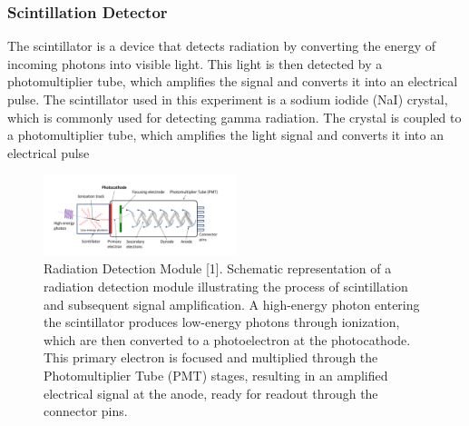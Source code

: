 \documentclass[12pt]{article}
\begin{document}
                \subsubsection{Scintillation Detector}
                        The scintillator is a device that detects radiation by converting the energy of incoming
                        photons into visible light. This light is then detected by a photomultiplier tube, which
                        amplifies the signal and converts it into an electrical pulse. The scintillator used in
                        this experiment is a sodium iodide (NaI) crystal, which is commonly used for detecting
                        gamma radiation. The crystal is coupled to a photomultiplier tube, which amplifies the
                        light signal and converts it into an electrical pulse
                

                \begin{figure}[!htb]
                        \centering
                        \includegraphics[width=0.5\textwidth]{./img/other/module.png}
                        \caption{Radiation Detection Module [1].  Schematic representation of a radiation detection module illustrating the process of scintillation and subsequent signal amplification. A high-energy photon entering the scintillator produces low-energy photons through ionization, which are then converted to a photoelectron at the photocathode. This primary electron is focused and multiplied through the Photomultiplier Tube (PMT) stages, resulting in an amplified electrical signal at the anode, ready for readout through the connector pins.}
                        \label{fig:Radiation Detection Module [1]}
                \end{figure}
\end{document}
